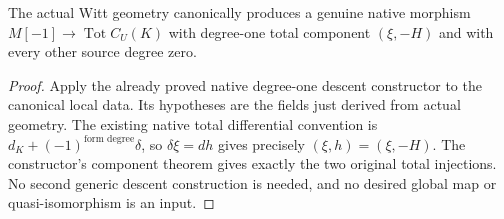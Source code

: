 \begin{theorem}
\label{thm:di-actual-witt-cech-one-map}
\leanok
{}
The actual Witt geometry canonically produces a genuine native morphism
$M[-1]\to\operatorname{Tot}C_U(K)$ with degree-one total component
$(\xi,-H)$ and with every other source degree zero.
\end{theorem}
\begin{proof}
Apply the already proved native degree-one descent constructor to the
canonical local data. Its hypotheses are the fields just derived from
actual geometry. The existing native total differential convention is
$d_K+(-1)^{\text{form degree}}\delta$, so $\delta\xi=dh$ gives precisely
$(\xi,h)=(\xi,-H)$. The constructor's component theorem gives exactly the
two original total injections. No second generic descent construction is
needed, and no desired global map or quasi-isomorphism is an input.
\end{proof}

